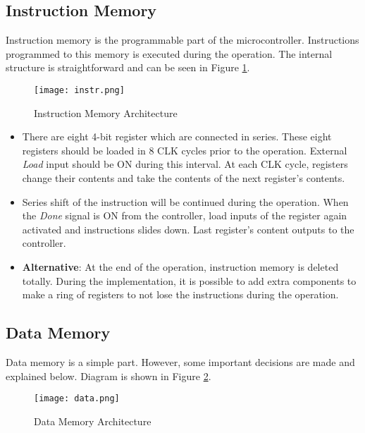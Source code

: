 \documentclass[12pt]{article}
\begin{document}
\newpage
\subsection*{Instruction Memory}
Instruction memory is the programmable part of the microcontroller. Instructions programmed to this memory is executed during the operation. The internal structure is straightforward and can be seen in Figure \ref{instr}. 

\begin{figure}[H]
\centering
\texttt{[image: instr.png]}
\caption{Instruction Memory Architecture}
\label{instr}
\end{figure}


\begin{itemize}
\item There are eight 4-bit register which are connected in series. These eight registers should be loaded in 8 CLK cycles prior to the operation. External \textsl{Load} input should be ON during this interval. At each CLK cycle, registers change their contents and take the contents of the next register's contents.

\item Series shift of the instruction will be continued during the operation. When the \textsl{Done} signal is ON from the controller, load inputs of the register again activated and instructions slides down. Last register's content outputs to the controller.

\item \textbf{Alternative}: At the end of the operation, instruction memory is deleted totally. During the implementation, it is possible to add extra components to make a ring of registers to not lose the instructions during the operation.

\end{itemize}


\subsection*{Data Memory}

Data memory is a simple part. However, some important decisions are made and explained below. Diagram is shown in Figure \ref{data}.

\begin{figure}[H]
\centering
\texttt{[image: data.png]}
\caption{Data Memory Architecture}
\label{data}
\end{figure}
\end{document}
